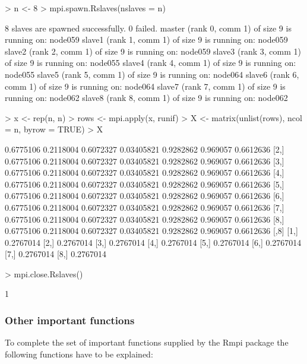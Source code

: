 \begin{Schunk}
\begin{Sinput}
> n <- 8
> mpi.spawn.Rslaves(nslaves = n)
\end{Sinput}
\begin{Soutput}
	8 slaves are spawned successfully. 0 failed.
master (rank 0, comm 1) of size 9 is running on: node059 
slave1 (rank 1, comm 1) of size 9 is running on: node059 
slave2 (rank 2, comm 1) of size 9 is running on: node059 
slave3 (rank 3, comm 1) of size 9 is running on: node055 
slave4 (rank 4, comm 1) of size 9 is running on: node055 
slave5 (rank 5, comm 1) of size 9 is running on: node064 
slave6 (rank 6, comm 1) of size 9 is running on: node064 
slave7 (rank 7, comm 1) of size 9 is running on: node062 
slave8 (rank 8, comm 1) of size 9 is running on: node062 
\end{Soutput}
\begin{Sinput}
> x <- rep(n, n)
> rows <- mpi.apply(x, runif)
> X <- matrix(unlist(rows), ncol = n, byrow = TRUE)
> X
\end{Sinput}
\begin{Soutput}
          [,1]      [,2]      [,3]       [,4]      [,5]     [,6]      [,7]
[1,] 0.6775106 0.2118004 0.6072327 0.03405821 0.9282862 0.969057 0.6612636
[2,] 0.6775106 0.2118004 0.6072327 0.03405821 0.9282862 0.969057 0.6612636
[3,] 0.6775106 0.2118004 0.6072327 0.03405821 0.9282862 0.969057 0.6612636
[4,] 0.6775106 0.2118004 0.6072327 0.03405821 0.9282862 0.969057 0.6612636
[5,] 0.6775106 0.2118004 0.6072327 0.03405821 0.9282862 0.969057 0.6612636
[6,] 0.6775106 0.2118004 0.6072327 0.03405821 0.9282862 0.969057 0.6612636
[7,] 0.6775106 0.2118004 0.6072327 0.03405821 0.9282862 0.969057 0.6612636
[8,] 0.6775106 0.2118004 0.6072327 0.03405821 0.9282862 0.969057 0.6612636
          [,8]
[1,] 0.2767014
[2,] 0.2767014
[3,] 0.2767014
[4,] 0.2767014
[5,] 0.2767014
[6,] 0.2767014
[7,] 0.2767014
[8,] 0.2767014
\end{Soutput}
\begin{Sinput}
> mpi.close.Rslaves()
\end{Sinput}
\begin{Soutput}
[1] 1
\end{Soutput}
\end{Schunk}


\subsubsection{Other important functions}

To complete the set of important functions supplied by the Rmpi
package the following functions have to be explained:

